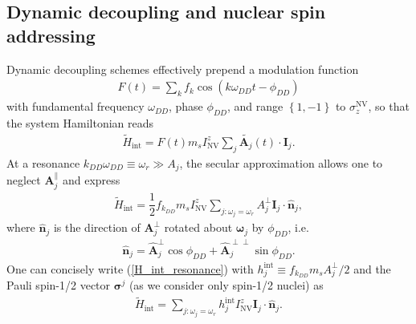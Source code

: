\documentclass[twocolumn]{revtex4}
\renewcommand{\t}{\text} %
\newcommand{\f}[2]{\dfrac{#1}{#2}} %
\newcommand{\p}[1]{\left(#1\right)} %
\renewcommand{\set}[1]{\left\{#1\right\}} %
\renewcommand{\v}{\bm} %
\newcommand{\uv}[1]{\hat{\v{#1}}} %
\renewcommand{\c}{\cdot} %
\newcommand{\NV}{\t{NV}}
\begin{document}
\subsection{Dynamic decoupling and nuclear spin addressing}

Dynamic decoupling schemes effectively prepend a modulation function
\begin{align}
  F\p{t}=\sum_kf_k\cos\p{k\omega_{DD}t-\phi_{DD}}
\end{align}
with fundamental frequency $\omega_{DD}$, phase $\phi_{DD}$, and range
$\set{1,-1}$ to $\sigma_z^\NV$, so that the system Hamiltonian reads
\begin{align}
  \tilde H_\t{int} =
  F\p{t}m_sI_\NV^z\sum_j\tilde{\v A_j}\p{t}\c\v I_j.
\end{align}
At a resonance $k_{DD}\omega_{DD}\equiv\omega_r\gg A_j$, the secular
approximation allows one to neglect $\v A_j^\parallel$ and express
\begin{align}
  \tilde H_\t{int} = \f12 f_{k_{DD}} m_sI_\NV^z
  \sum_{j:\omega_j=\omega_r} A_j^\perp\v I_j\c\uv n_j,
  \label{H_int_resonance}
\end{align}
where $\uv n_j$ is the direction of $\v A_j^\perp$ rotated about
$\uv\omega_j$ by $\phi_{DD}$, i.e.
\begin{align}
  \uv n_j = \uv A_j^\perp\cos\phi_{DD} +
  \uv A_j^{\perp\perp}\sin\phi_{DD}.
\end{align}
One can concisely write (\ref{H_int_resonance}) with
$h_j^\t{int}\equiv f_{k_{DD}}m_sA_j^\perp/2$ and the Pauli spin-1/2
vector $\v\sigma^j$ (as we consider only spin-1/2 nuclei) as
\begin{align}
  \tilde H_\t{int} = \sum_{j:\omega_j=\omega_r}
  h_j^\t{int}I_\NV^z\v I_j\c\uv n_j.
  \label{H_int}
\end{align}
\end{document}
